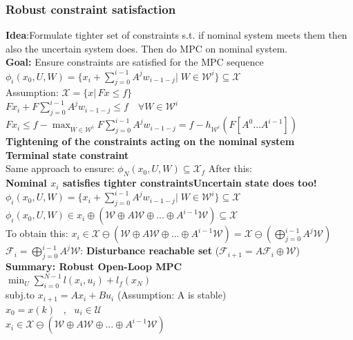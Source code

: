 \subsubsection{Robust constraint satisfaction}
\textbf{Idea}:Formulate tighter set of constraints s.t. if nominal system meets them \rightarrow then also the uncertain system does. Then do MPC on nominal system.\\
\textbf{Goal:} Ensure constraints are satisfied for the MPC sequence\\
$\phi_i(x_0,U,W)=\{x_i+\sum_{j=0}^{i-1}A^jw_{i-1-j}|\;W\in\mathcal{W}^i\}\subseteq\mathcal{X}$\\
Assumption: $\mathcal{X}=\{x|\,Fx\leq f\}$\\
$Fx_i+F\sum_{j=0}^{i-1}A^jw_{i-1-j}\leq f\quad\forall W\in\mathcal{W}^i$\\
$Fx_i\leq f-\max_{W\in\mathcal{W}^i}F\sum_{j=0}^{i-1}A^jw_{i-1-j}=f-h_{\mathcal{W}^i}(F [A^0 \ldots A^{i-1}])$\\
\Rightarrow \textbf{Tightening of the constraints acting on the nominal system}\\
\textbf{Terminal state constraint}\\
Same approach to ensure:
$\phi_{N}(x_0,U,W)\subseteq\mathcal{X}_f$
After this: \\\textbf{Nominal $x_i$ satisfies tighter constraints}\rightarrow \textbf{Uncertain state does too!}\\
$\phi_i(x_0,U,W)=\{x_i+\sum_{j=0}^{i-1}A^jw_{i-1-j}|\;W\in\mathcal{W}^i\}\subseteq\mathcal{X}$\\
\Rightarrow $\phi_i(x_0,U,W)\in x_i\oplus (\mathcal{W}\oplus A\mathcal{W}\oplus ...\oplus A^{i-1}\mathcal{W})\subseteq\mathcal{X}$\\
To obtain this: $x_i\in \mathcal{X}\ominus (\mathcal{W}\oplus A\mathcal{W}\oplus ... \oplus A^{i-1}\mathcal{W})=\mathcal{X}\ominus(\bigoplus_{j=0}^{i-1}A^j\mathcal{W})$\\
$\mathcal{F}_i=\bigoplus_{j=0}^{i-1}A^j\mathcal{W}$: \textbf{Disturbance reachable set} ($\mathcal{F}_{i+1}=A\mathcal{F}_i\oplus\mathcal{W}$)\\
\textbf{Summary: Robust Open-Loop MPC}\\
$\min_U\sum_{i=0}^{N-1}l(x_i,u_i)+l_f(x_N)$\\
subj.to $x_{i+1}=Ax_i+Bu_i$ (Assumption: A is stable)\\
$x_0=x(k)$ \, , \, $u_i\in\mathcal{U}$\\
$x_i\in\mathcal{X}\ominus(\mathcal{W}\oplus A\mathcal{W}\oplus...\oplus A^{i-1}\mathcal{W})$\\

